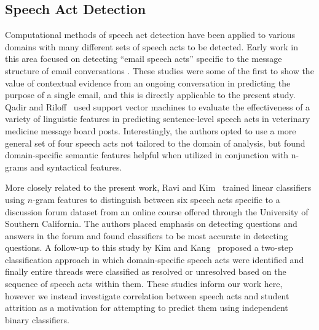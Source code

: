 \documentclass[twoside]{article}
\begin{document}
\subsection{Speech Act Detection}
Computational methods of speech act detection have been applied to various domains with many different sets of speech acts to be detected. Early work in this area focused on detecting ``email speech acts'' specific to the message structure of email conversations \cite{cohen2004learning,carvalho2005collective}. These studies were some of the first to show the value of contextual evidence from an ongoing conversation in predicting the purpose of a single email, and this is directly applicable to the present study. Qadir and Riloff~\cite{qadir2011classifying} used support vector machines to evaluate the effectiveness of a variety of linguistic features in predicting sentence-level speech acts in veterinary medicine message board posts. Interestingly, the authors opted to use a more general set of four speech acts not tailored to the domain of analysis, but found domain-specific semantic features helpful when utilized in conjunction with n-grams and syntactical features.
\par
More closely related to the present work, Ravi and Kim~\cite{ravi2007profiling} trained linear classifiers using $n$-gram features to distinguish between six speech acts specific to a discussion forum dataset from an online course offered through the University of Southern California. The authors placed emphasis on detecting questions and answers in the forum and found classifiers to be most accurate in detecting questions. A follow-up to this study by Kim and Kang~\cite{kim2014towards} proposed a two-step classification approach in which domain-specific speech acts were identified and finally entire threads were classified as resolved or unresolved based on the sequence of speech acts within them. These studies inform our work here, however we instead investigate correlation between speech acts and student attrition as a motivation for attempting to predict them using independent binary classifiers.
\end{document}
